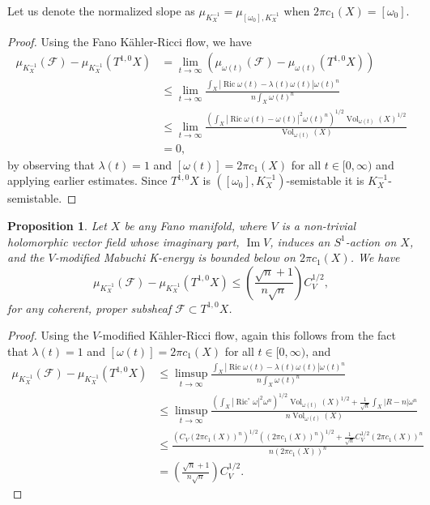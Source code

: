 \documentclass[12pt]{article}
\newtheorem{proposition}[theorem]{Proposition}
\numberwithin{equation}{section}
\DeclareMathOperator{\Ric}{Ric}
\DeclareMathOperator{\Vol}{Vol}
\DeclareMathOperator{\Imag}{Im}
\begin{document}
\noindent Let us denote the normalized slope as $\mu_{K_X^{-1}} = \mu_{[\omega_0], K_X^{-1}}$ when $2 \pi c_1(X) = [\omega_0]$.

\begin{proof}
Using the Fano K\"ahler-Ricci flow, we have 
\begin{align*}
    \mu_{K_X^{-1}}(\mathcal{F}) - \mu_{K_X^{-1}}(T^{1,0} X) &= \lim_{t \to \infty} \left(\mu_{\omega(t)}(\mathcal{F}) - \mu_{\omega(t)}(T^{1,0} X)\right)\\
    &\leq \lim_{t \to \infty}  \frac{\int_X |\Ric \omega(t) - \lambda(t) \omega(t)| \omega(t)^n}{n \int_X \omega(t)^n}\\
    &\leq \lim_{t \to \infty} \frac{\left(\int_X |\Ric \omega(t) - \omega(t)|^2 \omega(t)^n\right)^{1/2} \Vol_{\omega(t)}(X)^{1/2}}{\Vol_{\omega(t)}(X)}\\
    & = 0,
\end{align*}
by observing that $\lambda(t) = 1$ and $[\omega(t)] = 2\pi c_1(X)$ for all $t \in [0,\infty)$ and applying earlier estimates. Since $T^{1,0}X$ is $([\omega_0], K_X^{-1})$-semistable it is $K_X^{-1}$-semistable. 
\end{proof}

\begin{proposition}
Let $X$ be any Fano manifold, where $V$ is a non-trivial holomorphic vector field whose imaginary
part, $\Imag V$, induces an $S^1$-action on $X$, and the $V$-modified Mabuchi K-energy is bounded below on $2 \pi c_1(X)$. We have
\begin{equation*}
    \mu_{K_X^{-1}}(\mathcal{F}) - \mu_{K_X^{-1}}(T^{1,0} X) \leq \left(\frac{\sqrt{n}+1}{n\sqrt{n}}\right) C_V^{1/2},
\end{equation*}
for any coherent, proper subsheaf $\mathcal{F} \subset T^{1,0} X$.
\end{proposition}

\begin{proof}
Using the $V$-modified K\"ahler-Ricci flow, again this follows from the fact that $\lambda(t) = 1$ and $[\omega(t)] = 2 \pi c_1(X)$ for all $t \in [0,\infty)$, and 
\begin{align*}
    \mu_{K_X^{-1}}(\mathcal{F}) - \mu_{K_X^{-1}}(T^{1,0}X) &\leq
    \limsup_{t \to \infty}  \frac{\int_X |\Ric \omega(t) - \lambda(t) \omega(t)| \omega(t)^n}{n \int_X \omega(t)^n}\\
    &\leq \limsup_{t \to \infty} \frac{\left(\int_X |\Ric^\circ \omega|^2 \omega^n \right)^{1/2} \Vol_{\omega(t)}(X)^{1/2} + \frac{1}{\sqrt{n}}\int_X |R - n| \omega^n}{n\Vol_{\omega(t)}(X)}\\
    &\leq \frac{(C_V(2 \pi c_1(X))^n )^{1/2} ((2 \pi c_1(X))^n)^{1/2} + \frac{1}{\sqrt{n}} C_V^{1/2} (2 \pi c_1(X))^n}{n (2 \pi c_1(X))^n}\\
    &= \left(\frac{\sqrt{n}+1}{n\sqrt{n}}\right) C_V^{1/2}.
\end{align*}
\end{proof}
\end{document}
